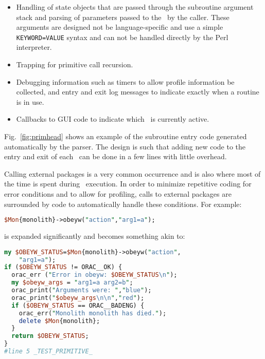 \documentclass[final,authoryear,5p,times,twocolumn]{elsarticle}
\begin{document}
\begin{itemize}

\item Handling of state objects that are passed through the subroutine
  argument stack and parsing of parameters passed to the \primitive\
  by the caller. These arguments are designed not be language-specific
  and use a simple \texttt{KEYWORD=VALUE} syntax
  and can not be handled directly by the Perl interpreter.

\item Trapping for primitive call recursion.

\item Debugging information
such as timers to allow profile information be
collected, and entry and exit log messages to indicate exactly when
a routine is in use.

\item Callbacks to GUI code to indicate which \primitive\ is
currently active.

\end{itemize}

Fig.\ \ref{fig:primhead} shows an example of the subroutine entry code generated automatically by the
parser. The design is such that adding new code to the entry and exit of each
\primitive\ can be done in a few lines with little overhead.

Calling external packages is a very common occurrence and is also where
most of the time is spent during \recipe\ execution. In order to
minimize repetitive coding for error conditions and to allow for profiling, calls to
external packages are surrounded by code to automatically handle these
conditions. For example:

\begin{lstlisting}[language=perl]
$Mon{monolith}->obeyw("action","arg1=a");
\end{lstlisting}

is expanded significantly and becomes something akin to:

\begin{lstlisting}[language=perl]
my $OBEYW_STATUS=$Mon{monolith}->obeyw("action",
    "arg1=a");
if ($OBEYW_STATUS != ORAC__OK) {
  orac_err ("Error in obeyw: $OBEYW_STATUS\n");
  my $obeyw_args = "arg1=a arg2=b";
  orac_print("Arguments were: ","blue");
  orac_print("$obeyw_args\n\n","red");
  if ($OBEYW_STATUS == ORAC__BADENG) {
    orac_err("Monolith monolith has died.");
    delete $Mon{monolith};
  }
  return $OBEYW_STATUS;
}
#line 5 _TEST_PRIMITIVE_
\end{lstlisting}
\end{document}
